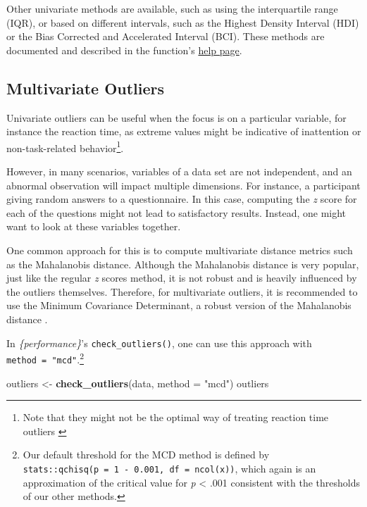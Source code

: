 \documentclass[sn-basic, lineno,pdflatex]{sn-jnl}
\newenvironment{Shaded}{\begin{snugshade}}{\end{snugshade}}
\newcommand{\AttributeTok}[1]{\textcolor[rgb]{0.13,0.29,0.53}{#1}}
\newcommand{\FunctionTok}[1]{\textcolor[rgb]{0.13,0.29,0.53}{\textbf{#1}}}
\newcommand{\NormalTok}[1]{#1}
\newcommand{\OtherTok}[1]{\textcolor[rgb]{0.56,0.35,0.01}{#1}}
\newcommand{\StringTok}[1]{\textcolor[rgb]{0.31,0.60,0.02}{#1}}
\begin{document}
Other univariate methods are available, such as using the interquartile
range (IQR), or based on different intervals, such as the Highest
Density Interval (HDI) or the Bias Corrected and Accelerated Interval
(BCI). These methods are documented and described in the function's
\href{https://easystats.github.io/performance/reference/check_outliers.html}{help
page}.

\hypertarget{multivariate-outliers}{%
\subsection{Multivariate Outliers}\label{multivariate-outliers}}

Univariate outliers can be useful when the focus is on a particular
variable, for instance the reaction time, as extreme values might be
indicative of inattention or non-task-related behavior\footnote{ Note
  that they might not be the optimal way of treating reaction time
  outliers \citep{ratcliff1993methods, van1995statistical}}.

However, in many scenarios, variables of a data set are not independent,
and an abnormal observation will impact multiple dimensions. For
instance, a participant giving random answers to a questionnaire. In
this case, computing the \emph{z} score for each of the questions might
not lead to satisfactory results. Instead, one might want to look at
these variables together.

One common approach for this is to compute multivariate distance metrics
such as the Mahalanobis distance. Although the Mahalanobis distance is
very popular, just like the regular \emph{z} scores method, it is not
robust and is heavily influenced by the outliers themselves. Therefore,
for multivariate outliers, it is recommended to use the Minimum
Covariance Determinant, a robust version of the Mahalanobis distance
\citep[MCD,][]{leys2018outliers, leys2019outliers}.

In \emph{\{performance\}}'s \texttt{check\_outliers()}, one can use this
approach with \texttt{method\ =\ "mcd"}.\footnote{Our default threshold
  for the MCD method is defined by
  \texttt{stats::qchisq(p\ =\ 1\ -\ 0.001,\ df\ =\ ncol(x))}, which
  again is an approximation of the critical value for \emph{p}
  \textless{} .001 consistent with the thresholds of our other methods.}

\begin{Shaded}
\begin{Highlighting}[]
\NormalTok{outliers }\OtherTok{\textless{}{-}} \FunctionTok{check\_outliers}\NormalTok{(data, }\AttributeTok{method =} \StringTok{"mcd"}\NormalTok{)}
\NormalTok{outliers}
\end{Highlighting}
\end{Shaded}
\end{document}
